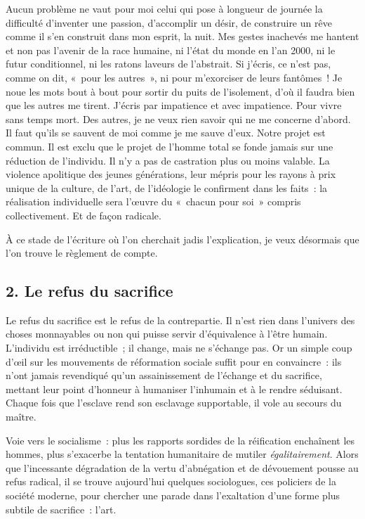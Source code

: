 \documentclass[french,twoside]{book} %
\begin{document}
Aucun problème ne vaut pour moi celui qui pose à longueur de journée la difficulté d’inventer une passion, d’accomplir un désir, de construire un rêve comme il s’en construit dans mon esprit, la nuit. Mes gestes inachevés me hantent et non pas l’avenir de la race humaine, ni l’état du monde en l’an 2000, ni le futur conditionnel, ni les ratons laveurs de l’abstrait. Si j’écris, ce n’est pas, comme on dit, « pour les autres », ni pour m’exorciser de leurs fantômes ! Je noue les mots bout à bout pour sortir du puits de l’isolement, d’où il faudra bien que les autres me tirent. J’écris par impatience et avec impatience. Pour vivre sans temps mort. Des autres, je ne veux rien savoir qui ne me concerne d’abord. Il faut qu’ils se sauvent de moi comme je me sauve d’eux. Notre projet est commun. Il est exclu que le projet de l’homme total se fonde jamais sur une réduction de l’individu. Il n’y a pas de castration plus ou moins valable. La violence apolitique des jeunes générations, leur mépris pour les rayons à prix unique de la culture, de l’art, de l’idéologie le confirment dans les faits : la réalisation individuelle sera l’œuvre du « chacun pour soi » compris collectivement. Et de façon radicale.\par
À ce stade de l’écriture où l’on cherchait jadis l’explication, je veux désormais que l’on trouve le règlement de compte.
\subsection[{2. Le refus du sacrifice}]{\textsc{2.} Le refus du sacrifice}
\noindent Le refus du sacrifice est le refus de la contrepartie. Il n’est rien dans l’univers des choses monnayables ou non qui puisse servir d’équivalence à l’être humain. L’individu est irréductible ; il change, mais ne s’échange pas. Or un simple coup d’œil sur les mouvements de réformation sociale suffit pour en convaincre : ils n’ont jamais revendiqué qu’un assainissement de l’échange et du sacrifice, mettant leur point d’honneur à humaniser l’inhumain et à le rendre séduisant. Chaque fois que l’esclave rend son esclavage supportable, il vole au secours du maître.\par
Voie vers le socialisme : plus les rapports sordides de la réification enchaînent les hommes, plus s’exacerbe la tentation humanitaire de mutiler \emph{égalitairement}. Alors que l’incessante dégradation de la vertu d’abnégation et de dévouement pousse au refus radical, il se trouve aujourd’hui quelques sociologues, ces policiers de la société moderne, pour chercher une parade dans l’exaltation d’une forme plus subtile de sacrifice : l’art.\par
\end{document}
